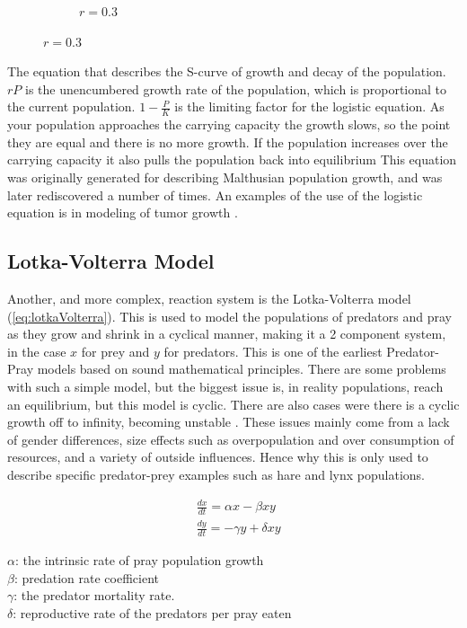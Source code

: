 \documentclass[12pt, letterpaper]{article}
\begin{document}
\begin{figure}[h]
\begin{subfigure}[b]{.3\linewidth}
    \caption{$r=0.3$}
  \end{subfigure}
\end{figure}

The equation that describes the S-curve of growth and decay of the population. $rP$ is the
unencumbered growth rate of the population, which is proportional to the current population.
$1- \frac{P}{K}$ is the limiting factor for the logistic equation. As your population approaches the carrying
capacity the growth slows, so the point they are equal and there is no more growth. If the population
increases over the carrying capacity it also pulls the population back into equilibrium This equation was
originally generated for describing Malthusian population growth, and was later rediscovered a number of
times. An examples of the use of the logistic equation is in modeling of tumor growth \citep{logisticTumor}.

\subsection{Lotka-Volterra Model} \label{lotkavolterra}

Another, and more complex, reaction system is the Lotka-Volterra model (\ref{eq:lotkaVolterra}). This is used
to model the populations of predators and pray as they grow and shrink in a cyclical manner, making it a 2
component system, in the case $x$ for prey and $y$ for predators. This is one of the earliest Predator-Pray
models based on sound mathematical principles. There are some problems with such a simple model, but the
biggest issue is, in reality populations, reach an equilibrium, but this model is cyclic. There are
also cases were there is a cyclic growth off to infinity, becoming unstable \citep{lotkaVolterra}. These
issues mainly come from a lack of 
gender differences, size effects such as overpopulation and over consumption of resources, and a variety of
outside influences. Hence why this is only used to describe specific predator-prey examples such as hare and lynx populations. 

\begin{singlespace}
  \begin{equation}\label{eq:lotkaVolterra}
    \begin{split}
      &\frac{dx}{dt} = \alpha x - \beta x y \\
      &\frac{dy}{dt} = - \gamma y + \delta x y
    \end{split}
  \end{equation}
  \begin{small}
$\alpha$: the intrinsic rate of pray population growth \\
$\beta$: predation rate coefficient \\
$\gamma$: the predator mortality rate. \\
$\delta$: reproductive rate of the predators per pray eaten \\
  \end{small}
\end{singlespace}
\end{document}
